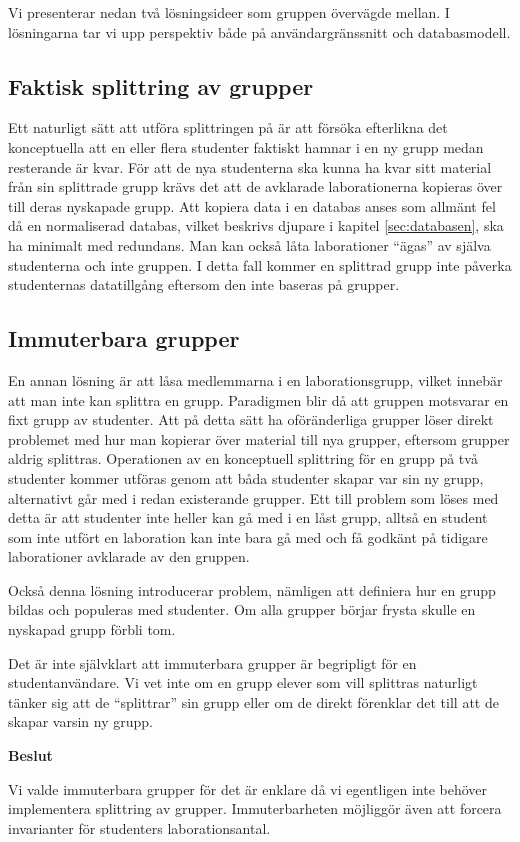 Vi presenterar nedan två lösningsideer som gruppen övervägde mellan. I lösningarna tar vi upp perspektiv både på användargränssnitt och databasmodell.

\subsection{Faktisk splittring av grupper}
Ett naturligt sätt att utföra splittringen på är att försöka efterlikna det konceptuella att en eller flera studenter faktiskt hamnar i en ny grupp medan resterande är kvar. För att de nya studenterna ska kunna ha kvar sitt material från sin splittrade grupp krävs det att de avklarade laborationerna kopieras över till deras nyskapade grupp. Att kopiera data i en databas anses som allmänt fel då en normaliserad databas, vilket beskrivs djupare i kapitel \ref{sec:databasen}, ska ha minimalt med redundans. Man kan också låta laborationer “ägas” av själva studenterna och inte gruppen. I detta fall kommer en splittrad grupp inte påverka studenternas datatillgång eftersom den inte baseras på grupper.

\subsection{Immuterbara grupper}
En annan lösning är att låsa medlemmarna i en laborationsgrupp, vilket innebär att man inte kan splittra en grupp. Paradigmen blir då att gruppen motsvarar en fixt grupp av studenter. Att på detta sätt ha oföränderliga grupper löser direkt problemet med hur man kopierar över material till nya grupper, eftersom grupper aldrig splittras. Operationen av en konceptuell splittring för en grupp på två studenter kommer utföras genom att båda studenter skapar var sin ny grupp, alternativt går med i redan existerande grupper. Ett till problem som löses med detta är att studenter inte heller kan gå med i en låst grupp, alltså en student som inte utfört en laboration kan inte bara gå med och få godkänt på tidigare laborationer avklarade av den gruppen.

Också denna lösning introducerar problem, nämligen att definiera hur en grupp bildas och populeras med studenter. Om alla grupper börjar frysta skulle en nyskapad grupp förbli tom.

Det är inte självklart att immuterbara grupper är begripligt för en studentanvändare.  Vi vet inte om en grupp elever som vill splittras naturligt tänker sig att de “splittrar” sin grupp eller om de direkt förenklar det till att de skapar varsin ny grupp.

\begin{flushright}

  \textbf{Beslut}

  Vi valde immuterbara grupper för det är enklare då vi egentligen inte behöver implementera splittring av grupper. Immuterbarheten möjliggör även att forcera invarianter för studenters laborationsantal.
\end{flushright}

